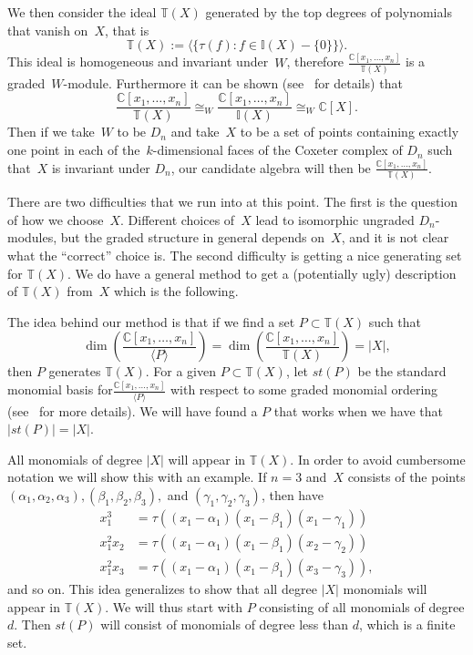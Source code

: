 \documentclass[10pt]{article}
\newcommand{\coloneqq}{:=}
\begin{document}
We then consider the ideal $\mathbb{T}(X)$ generated by the top degrees of polynomials that vanish on~$X$, that 
is
\begin{equation}
\mathbb{T}(X)\coloneqq \langle\{\tau(f):f\in \mathbb{I}(X)-\{0\} \}\rangle.
\end{equation}
 This ideal is homogeneous 
and invariant under~$W$, therefore $\frac{\mathbb{C}[x_1,\ldots, x_n]}{\mathbb{T}(X)}$ is a graded~$W$-module. Furthermore 
it can be shown (see~\cite{GP} for details) that
\begin{equation}
\frac{\mathbb{C}[x_1,\ldots, x_n]}{\mathbb{T}(X)}\cong_W 
\frac{\mathbb{C}[x_1,\ldots, x_n]}{\mathbb{I}(X)}\cong_W \mathbb{C}[X].
\end{equation}
 Then if we take~$W$ to be $D_n$ and take~$X$ to be a set of points containing exactly one point in each of the~$k$-dimensional faces of the Coxeter complex of $D_n$ 
such that~$X$ is invariant under $D_n$, our candidate algebra will then be $\frac{\mathbb{C}[x_1,\ldots, x_n]}{\mathbb{T}(X)}$.


There are two difficulties that we run into at this point. The first is the question of how we choose~$X$. Different choices 
of~$X$ lead to isomorphic ungraded $D_n$-modules, but the graded structure in general depends on~$X$, and it is not clear 
what the ``correct'' choice is. The second difficulty is getting a nice generating set for $\mathbb{T}(X)$. We do have a 
general method to get a (potentially ugly) description of $\mathbb{T}(X)$ from~$X$ which is the following.

The idea behind our method is that if we find a set $P\subset \mathbb{T}(X)$ such 
that
\begin{equation}
\dim\left(\frac{\mathbb{C}[x_1,\ldots, x_n]}{\langle P\rangle}\right)=\dim \left(\frac{\mathbb{C}[x_1,\ldots, 
x_n]}{\mathbb{T}(X)}\right)=\vert X\vert,
\end{equation}
then $P$ generates $\mathbb{T}(X)$. For a given $P\subset 
\mathbb{T}(X)$, let $st(P)$ be the standard monomial basis for$\frac{\mathbb{C}[x_1,\ldots, x_n]}{\langle P\rangle}$ with 
respect to some graded monomial ordering (see~\cite{Gr} for more details). We will have found a $P$ that works when we have 
that $\vert st(P)\vert=\vert X\vert$. 

	All monomials of degree $\vert X\vert$ will appear in $\mathbb{T}(X)$. In order to avoid cumbersome notation we will show 
this with an example. If $n=3$ and~$X$ consists of the points $(\alpha_1,\alpha_2,\alpha_3), (\beta_1,\beta_2,\beta_3),$ 
and $(\gamma_1,\gamma_2,\gamma_3)$, then have 
\begin{align}
x_1^3&=\tau((x_1-\alpha_1)(x_1-\beta_1)(x_1-\gamma_1))\\ 
x_1^2x_2&=\tau((x_1-\alpha_1)(x_1-\beta_1)(x_2-\gamma_2))\\ 
x_1^2x_3&=\tau((x_1-\alpha_1)(x_1-\beta_1)(x_3-\gamma_3)),
\end{align} 
and so on.
This idea generalizes to show that all degree $\vert X\vert$ monomials will appear in $\mathbb{T}(X)$. We will thus start with 
$P$ consisting of all monomials of degree $d$. Then $st(P)$ will consist of monomials of degree less than $d$, which is a 
finite set.
\end{document}
